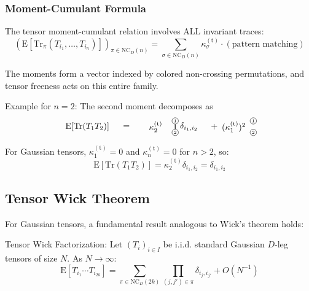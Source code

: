 \subsubsection{Moment-Cumulant Formula}

The tensor moment-cumulant relation involves ALL invariant traces:
\[
   \boxed{\left( \mathrm{E}[\mathrm{Tr}_{\pi}(T_{i_1},\ldots,T_{i_n})] \right)_{\pi \in \mathrm{NC}_D(n)} = \sum_{\sigma \in \mathrm{NC}_D(n)} \kappa_{\sigma}^{(\mathrm{t})} \cdot (\text{pattern matching})}
\]

The moments form a vector indexed by colored non-crossing permutations, and tensor freeness acts on this entire family.

Example for $n=2$: The second moment decomposes as
\[
\begin{tikzpicture}[baseline=-.5em, scale=0.8]
   \node at (-1,0) {$\mathrm{E}[\mathrm{Tr}(T_1 T_2)]$};
   \node at (1,0) {$=$};
   
   \node at (2.5,0) {$\kappa_2^{(\mathrm{t})}$};
   \node[circle, draw, inner sep=1pt] (A1) at (3.5,0.3) {\tiny 1};
   \node[circle, draw, inner sep=1pt] (A2) at (3.5,-0.3) {\tiny 2};
   \draw[thick] (A1) -- (A2);
   \node at (4.2,0) {$\delta_{i_1,i_2}$};
   
   \node at (5.5,0) {$+$};
   
   \node at (6.5,0) {$(\kappa_1^{(\mathrm{t})})^2$};
   \node[circle, draw, inner sep=1pt] (B1) at (7.5,0.3) {\tiny 1};
   \node[circle, draw, inner sep=1pt] (B2) at (7.5,-0.3) {\tiny 2};
\end{tikzpicture}
\]

For Gaussian tensors, $\kappa_1^{(\mathrm{t})} = 0$ and $\kappa_n^{(\mathrm{t})} = 0$ for $n > 2$, so:
\[
   \mathrm{E}[\mathrm{Tr}(T_1 T_2)] = \kappa_2^{(\mathrm{t})} \delta_{i_1,i_2} = \delta_{i_1,i_2}
\]

\subsection{Tensor Wick Theorem}

For Gaussian tensors, a fundamental result analogous to Wick's theorem holds:

Tensor Wick Factorization:
Let $(T_i)_{i \in I}$ be i.i.d. standard Gaussian $D$-leg tensors of size $N$. As $N \to \infty$:
\[
   \mathrm{E}[T_{i_1} \cdots T_{i_{2k}}] = \sum_{\pi \in \mathrm{NC}_D(2k)} \prod_{(j,j') \in \pi} \delta_{i_j, i_{j'}} + O(N^{-1})
\]

